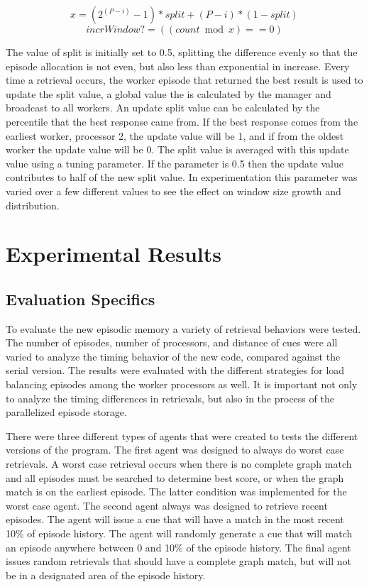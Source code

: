 \documentclass[11pt]{article} %
\begin{document}
\begin{equation}x = (2^(P-i) -1)*split + (P-i) *(1-split)\end{equation}
\begin{equation}incrWindow? = ((count \bmod x) == 0)\end{equation}

The value of split is initially set to 0.5, splitting the difference evenly so
that the episode allocation is not even, but also less than exponential in
increase. Every time a retrieval occurs, the worker episode that returned the
best result is used to update the split value, a global value the is calculated
by the manager and broadcast to all workers. An update split value can be
calculated by the percentile that the best response came from. If the best
response comes from the earliest worker, processor 2, the update value will be
1, and if from the oldest worker the update value will be 0. The split value is
averaged with this update value using a tuning parameter. If the parameter is
0.5 then the update value contributes to half of the new split value. In
experimentation this parameter was varied over a few different values to see the
effect on window size growth and distribution.

\section{Experimental Results}
\subsection{Evaluation Specifics}

To evaluate the new episodic memory a variety of retrieval behaviors were tested. 
The number of episodes, number of processors, and distance of cues
 were all varied to analyze the timing behavior of the new
code, compared against the serial version. The results were evaluated with the
different strategies for load balancing episodes among the worker processors as
well. It is important not only to analyze the timing differences in retrievals,
but also in the process of the parallelized episode storage.

There were three different types of agents that were created to tests the
different versions of the program. The first agent was designed to always do
worst case retrievals. A worst case retrieval occurs when there is no complete
graph match and all episodes must be searched to determine best score, or when
the graph match is on the earliest episode. The latter condition was implemented
for the worst case agent. The second agent always was designed to retrieve
recent episodes. The agent will issue a cue that will have a match in the most
recent 10\% of episode history. The agent will randomly generate a cue that will
match an episode anywhere between 0 and 10\% of the episode history. The final
agent issues random retrievals that should have a complete graph match, but will
not be in a designated area of the episode history.
\end{document}
